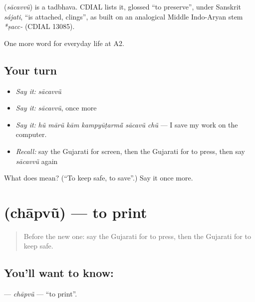 \begin{cousinweb}
\textbf{} (\emph{sācavvũ}) is a tadbhava. CDIAL lists it, glossed \textquotedblleft{}to preserve\textquotedblright{}, under Sanskrit \emph{sájati}, \textquotedblleft{}is attached, clings\textquotedblright{}, as built on an analogical Middle Indo-Aryan stem \emph{*ṣacc-} (CDIAL 13085).
\end{cousinweb}

\begin{grammarlens}[title={What you've built}]
One more word for everyday life at A2.
\end{grammarlens}

\subsection*{Your turn}
\begin{itemize}
\raggedright
  \item \emph{Say it:} \emph{sācavvũ}
  \item \emph{Say it:} \emph{sācavvũ}, once more
  \item \emph{Say it:} \emph{hũ mārũ kām kampyūṭarmā̃ sācavũ chũ} — I save my work on the computer.
  \item \emph{Recall:} say the Gujarati for screen, then the Gujarati for to press, then say \emph{sācavvũ} again
\end{itemize}

\begin{tcolorbox}[breakable,colback=teal!4,colframe=teal!35!black,title={Before you move on}]
What does  mean? (\textquotedblleft{}To keep safe, to save\textquotedblright{}.) Say it once more.
\end{tcolorbox}
\section[\texorpdfstring{\gu{છાપવું} (chāpvũ)}{છાપવું (chāpvũ)}]{ (chāpvũ) — to print}

\label{lesson:GU-C250-chapvu}



\begin{quote}
Before the new one: say the Gujarati for to press, then the Gujarati for to keep safe.
\end{quote}

\subsection*{You'll want to know: }
\textbf{} — \emph{chāpvũ} — \textquotedblleft{}to print\textquotedblright{}.

